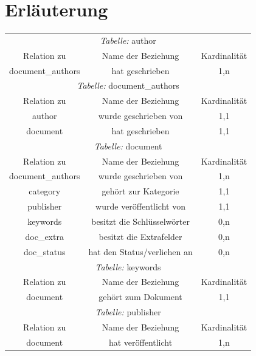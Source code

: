 \section{Erläuterung}

\begin{longtable}{@{}ccc@{}}
  \toprule
  \multicolumn{3}{c}{\emph{Tabelle:} author} \\
  Relation zu & Name der Beziehung & Kardinalität \\
  \cmidrule(lr){1-1}\cmidrule(lr){2-2}\cmidrule(lr){3-3}
  document\_authors & hat geschrieben & 1,n \\
  
  \toprule
  \multicolumn{3}{c}{\emph{Tabelle:} document\_authors} \\
  Relation zu & Name der Beziehung & Kardinalität \\
  \cmidrule(lr){1-1}\cmidrule(lr){2-2}\cmidrule(lr){3-3}
  author & wurde geschrieben von & 1,1 \\
  document & hat geschrieben & 1,1\\

  \toprule
  \multicolumn{3}{c}{\emph{Tabelle:} document} \\
  Relation zu & Name der Beziehung & Kardinalität \\
  \cmidrule(lr){1-1}\cmidrule(lr){2-2}\cmidrule(lr){3-3}
  document\_authors & wurde geschrieben von & 1,n\\
  category & gehört zur Kategorie & 1,1\\
  publisher & wurde veröffentlicht von & 1,1\\
  keywords & besitzt die Schlüsselwörter & 0,n\\  
  doc\_extra & besitzt die Extrafelder & 0,n\\
  doc\_status & hat den Status/verliehen an & 0,n\\

  \toprule
  \multicolumn{3}{c}{\emph{Tabelle:} keywords} \\
  Relation zu & Name der Beziehung & Kardinalität \\
  \cmidrule(lr){1-1}\cmidrule(lr){2-2}\cmidrule(lr){3-3}
  document & gehört zum Dokument & 1,1 \\

  \toprule
  \multicolumn{3}{c}{\emph{Tabelle:} publisher} \\
  Relation zu & Name der Beziehung & Kardinalität \\
  \cmidrule(lr){1-1}\cmidrule(lr){2-2}\cmidrule(lr){3-3}
  document & hat veröffentlicht & 1,n \\


\end{longtable}
